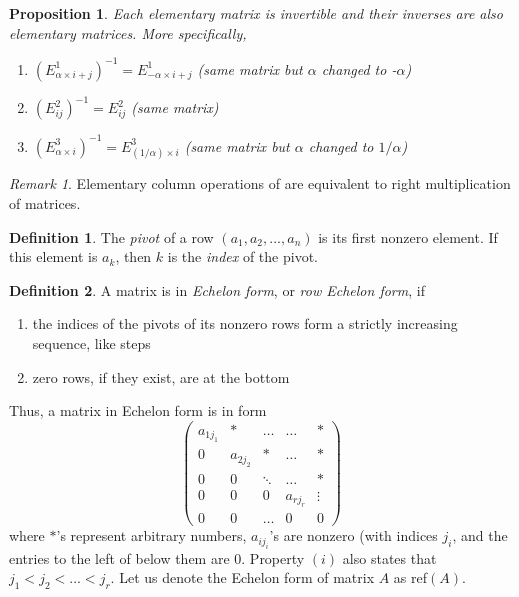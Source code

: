 \documentclass{article}
\newtheorem{proposition}[theorem]{Proposition}
\theoremstyle{remark}
\newtheorem*{remark}{Remark}
\theoremstyle{definition}
\newtheorem{definition}{Definition}[section]
\begin{document}
    \begin{proposition}
    Each elementary matrix is invertible and their inverses are also elementary matrices. More specifically, 
    \begin{enumerate}
        \item $(E^1_{\alpha \times i + j})^{-1} = E^1_{-\alpha \times i + j}$ (same matrix but $\alpha$ changed to -$\alpha$)
        \item $(E^2_{i j})^{-1} = E^2_{i j}$ (same matrix) 
        \item $(E^3_{\alpha \times i})^{-1} = E^{3}_{(1/\alpha) \times i}$ (same matrix but $\alpha$ changed to $1 / \alpha$)
    \end{enumerate}
    \end{proposition}

    \begin{remark}
    Elementary column operations of are equivalent to right multiplication of matrices. 
    \end{remark}

    \begin{definition}
    The \textit{pivot} of a row $(a_1, a_2, ..., a_n)$ is its first nonzero element. If this element is $a_k$, then $k$ is the \textit{index} of the pivot. 
    \end{definition}

    \begin{definition}
    A matrix is in \textit{Echelon form}, or \textit{row Echelon form}, if 
    \begin{enumerate}
        \item the indices of the pivots of its nonzero rows form a strictly increasing sequence, like steps
        \item zero rows, if they exist, are at the bottom
    \end{enumerate}
    Thus, a matrix in Echelon form is in form
    \[\begin{pmatrix}
    a_{1 j_1} & * & \ldots & \ldots & * \\
    0 & a_{2 j_2} & * & \ldots & * \\
    0& 0& \ddots & \ldots & * \\
    0& 0& 0& a_{r j_r} & \vdots \\
    0 & 0 & \ldots & 0 & 0
    \end{pmatrix}\]
    where $*$'s represent arbitrary numbers, $a_{i j_i}$'s are nonzero (with indices $j_i$, and the entries to the left of below them are $0$. Property $(i)$ also states that $j_1 < j_2 < ... < j_r$. Let us denote the Echelon form of matrix $A$ as ref$(A)$. 
    \end{definition}
\end{document}
